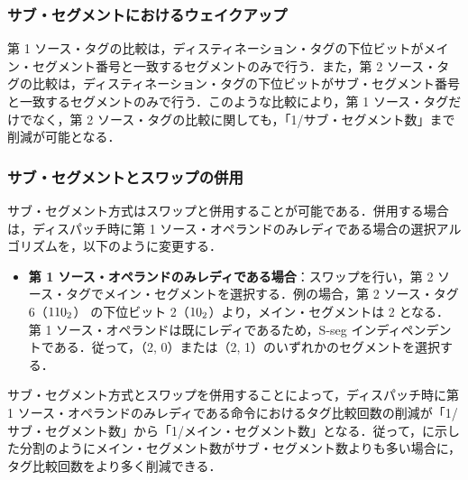 \subsubsection{サブ・セグメントにおけるウェイクアップ}
第 1 ソース・タグの比較は，ディスティネーション・タグの下位ビットがメイン・セグメント番号と一致するセグメントのみで行う．また，第 2 ソース・タグの比較は，ディスティネーション・タグの下位ビットがサブ・セグメント番号と一致するセグメントのみで行う．このような比較により，第 1 ソース・タグだけでなく，第 2  ソース・タグの比較に関しても，「1/サブ・セグメント数」まで削減が可能となる．

\subsubsection{サブ・セグメントとスワップの併用}
サブ・セグメント方式はスワップと併用することが可能である．併用する場合は，ディスパッチ時に第 1 ソース・オペランドのみレディである場合の選択アルゴリズムを，以下のように変更する．
\begin{itemize}
  \item \textbf{第 1 ソース・オペランドのみレディである場合}：スワップを行い，第 2 ソース・タグでメイン・セグメントを選択する．例の場合，第 2 ソース・タグ 6（${\rm 110_2}$） の下位ビット 2（${\rm 10_2}$）より，メイン・セグメントは 2 となる．第 1 ソース・オペランドは既にレディであるため，S-seg インディペンデントである．従って，（2, 0）または（2, 1）のいずれかのセグメントを選択する．
\end{itemize}
サブ・セグメント方式とスワップを併用することによって，ディスパッチ時に第 1 ソース・オペランドのみレディである命令におけるタグ比較回数の削減が「1/サブ・セグメント数」から「1/メイン・セグメント数」となる．従って，に示した分割のようにメイン・セグメント数がサブ・セグメント数よりも多い場合に，タグ比較回数をより多く削減できる．















